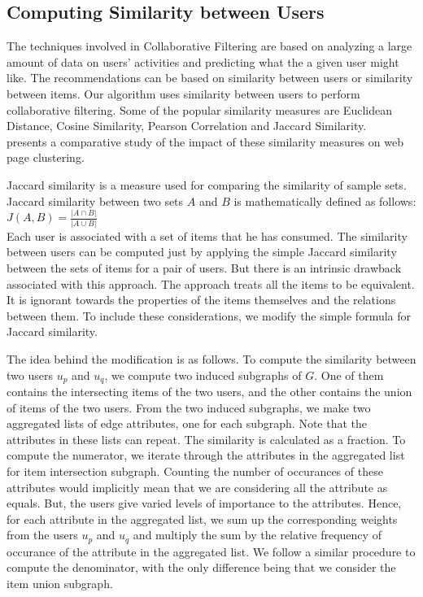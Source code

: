 \documentclass{acm_proc_article-sp}
\begin{document}
\subsection{Computing Similarity between Users}
\label{sec:userSimilarity}

The techniques involved in Collaborative Filtering are based on analyzing a large amount of data on users' activities and predicting what the a given user might like. The recommendations can be based on similarity between users or similarity between items. Our algorithm uses similarity between users to perform collaborative filtering. Some of the popular similarity measures are Euclidean Distance, Cosine Similarity, Pearson Correlation and Jaccard Similarity. ~\cite{alexander} presents a comparative study of the impact of these similarity measures on web page clustering.

Jaccard similarity is a measure used for comparing the similarity of sample sets. Jaccard similarity between two sets $A$ and $B$ is mathematically defined as follows:\\
$J(A,B) = \frac{|A \cap B|}{|A \cup B|}$\\
Each user is associated with a set of items that he has consumed. The similarity between users can be computed just by applying the simple Jaccard similarity between the sets of items for a pair of users. But there is an intrinsic drawback associated with this approach. The approach treats all the items to be equivalent. It is ignorant towards the properties of the items themselves and the relations between them. To include these considerations, we modify the simple formula for Jaccard similarity.

The idea behind the modification is as follows. To compute the similarity between two users $u_p$ and $u_q$, we compute two induced subgraphs of $G$. One of them contains the intersecting items of the two users, and the other contains the union of items of the two users. From the two induced subgraphs, we make two aggregated lists of edge attributes, one for each subgraph. Note that the attributes in these lists can repeat. The similarity is calculated as a fraction. To compute the numerator, we iterate  through the attributes in the aggregated list for item intersection subgraph. Counting the number of occurances of these attributes would implicitly mean that we are considering all the attribute as equals. But, the users give varied levels of importance to the attributes. Hence, for each attribute in the aggregated list, we sum up the corresponding weights from the users $u_p$ and $u_q$ and multiply the sum by the relative frequency of occurance of the attribute in the aggregated list. We follow a similar 
procedure to compute the denominator, with the only difference being that we consider the item union subgraph.
\end{document}
